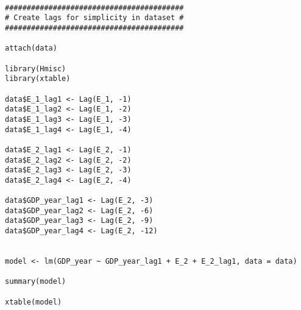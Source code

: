 \begin{lstlisting}
    
#########################################
# Create lags for simplicity in dataset #
#########################################

attach(data)

library(Hmisc)
library(xtable)

data$E_1_lag1 <- Lag(E_1, -1)
data$E_1_lag2 <- Lag(E_1, -2)
data$E_1_lag3 <- Lag(E_1, -3)
data$E_1_lag4 <- Lag(E_1, -4)

data$E_2_lag1 <- Lag(E_2, -1)
data$E_2_lag2 <- Lag(E_2, -2)
data$E_2_lag3 <- Lag(E_2, -3)
data$E_2_lag4 <- Lag(E_2, -4)

data$GDP_year_lag1 <- Lag(E_2, -3)
data$GDP_year_lag2 <- Lag(E_2, -6)
data$GDP_year_lag3 <- Lag(E_2, -9)
data$GDP_year_lag4 <- Lag(E_2, -12)


model <- lm(GDP_year ~ GDP_year_lag1 + E_2 + E_2_lag1, data = data)

summary(model)

xtable(model)
\end{lstlisting}